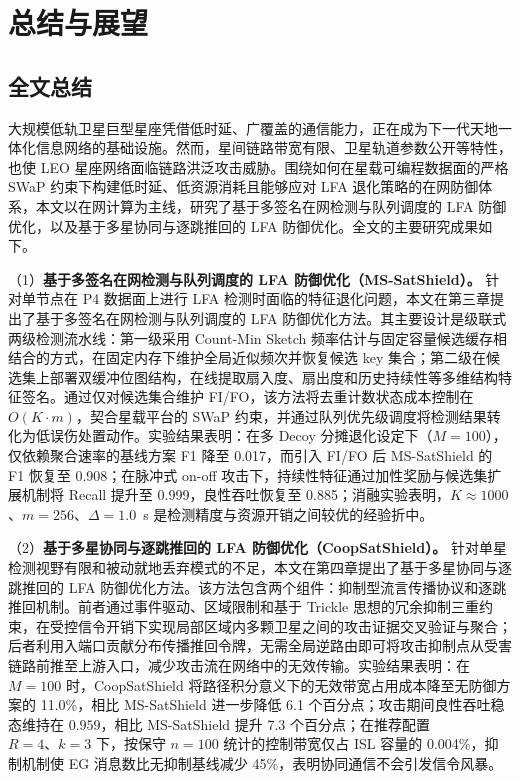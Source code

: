 \chapter{总结与展望}
\label{chap:conclusion}

\section{全文总结}

大规模低轨卫星巨型星座凭借低时延、广覆盖的通信能力，正在成为下一代天地一体化信息网络的基础设施。然而，星间链路带宽有限、卫星轨道参数公开等特性，也使 LEO 星座网络面临链路洪泛攻击威胁。围绕如何在星载可编程数据面的严格 SWaP 约束下构建低时延、低资源消耗且能够应对 LFA 退化策略的在网防御体系，本文以在网计算为主线，研究了基于多签名在网检测与队列调度的 LFA 防御优化，以及基于多星协同与逐跳推回的 LFA 防御优化。全文的主要研究成果如下。

（1）\textbf{基于多签名在网检测与队列调度的 LFA 防御优化（MS-SatShield）。} 针对单节点在 P4 数据面上进行 LFA 检测时面临的特征退化问题，本文在第三章提出了基于多签名在网检测与队列调度的 LFA 防御优化方法。其主要设计是级联式两级检测流水线：第一级采用 Count-Min Sketch 频率估计与固定容量候选缓存相结合的方式，在固定内存下维护全局近似频次并恢复候选 key 集合；第二级在候选集上部署双缓冲位图结构，在线提取扇入度、扇出度和历史持续性等多维结构特征签名。通过仅对候选集合维护 FI/FO，该方法将去重计数状态成本控制在 $O(K \cdot m)$，契合星载平台的 SWaP 约束，并通过队列优先级调度将检测结果转化为低误伤处置动作。实验结果表明：在多 Decoy 分摊退化设定下（$M=100$），仅依赖聚合速率的基线方案 F1 降至 0.017，而引入 FI/FO 后 MS-SatShield 的 F1 恢复至 0.908；在脉冲式 on-off 攻击下，持续性特征通过加性奖励与候选集扩展机制将 Recall 提升至 0.999，良性吞吐恢复至 0.885；消融实验表明，$K \approx 1000$、$m = 256$、$\Delta = 1.0$~s 是检测精度与资源开销之间较优的经验折中。

（2）\textbf{基于多星协同与逐跳推回的 LFA 防御优化（CoopSatShield）。} 针对单星检测视野有限和被动就地丢弃模式的不足，本文在第四章提出了基于多星协同与逐跳推回的 LFA 防御优化方法。该方法包含两个组件：抑制型流言传播协议和逐跳推回机制。前者通过事件驱动、区域限制和基于 Trickle 思想的冗余抑制三重约束，在受控信令开销下实现局部区域内多颗卫星之间的攻击证据交叉验证与聚合；后者利用入端口贡献分布传播推回令牌，无需全局逆路由即可将攻击抑制点从受害链路前推至上游入口，减少攻击流在网络中的无效传输。实验结果表明：在 $M=100$ 时，CoopSatShield 将路径积分意义下的无效带宽占用成本降至无防御方案的 11.0\%，相比 MS-SatShield 进一步降低 6.1 个百分点；攻击期间良性吞吐稳态维持在 $0.959$，相比 MS-SatShield 提升 7.3 个百分点；在推荐配置 $R=4、 k=3$ 下，按保守 $n=100$ 统计的控制带宽仅占 ISL 容量的 0.004\%，抑制机制使 EG 消息数比无抑制基线减少 45\%，表明协同通信不会引发信令风暴。


